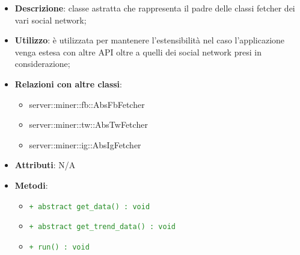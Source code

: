 				\begin{itemize}
				\item \textbf{Descrizione}: classe astratta che rappresenta il padre delle classi fetcher dei vari social network;
				\item \textbf{Utilizzo}: è utilizzata per mantenere l'estensibilità nel caso l'applicazione venga estesa con altre API  oltre a quelli dei social network presi in considerazione;
				\item \textbf{Relazioni con altre classi}:
					\begin{itemize}
						\item server::miner::fb::AbsFbFetcher
						\item server::miner::tw::AbsTwFetcher
						\item server::miner::ig::AbsIgFetcher
					\end{itemize}
				\item \textbf{Attributi}: N/A
				\item \textbf{Metodi}:
					\begin{itemize}
						\item \textcolor{forestgreen}{\texttt{+ abstract get\_data() : void}}
						\item \textcolor{forestgreen}{\texttt{+ abstract get\_trend\_data() : void}}
						\item \textcolor{forestgreen}{\texttt{+ run() : void}}
					\end{itemize}
			\end{itemize}

